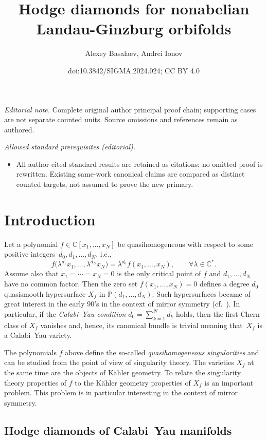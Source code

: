 \documentclass[10pt,a4paper]{article}
\title{Hodge diamonds for nonabelian Landau-Ginzburg orbifolds}
\author{Alexey Basalaev, Andrei Ionov}
\date{doi:10.3842/SIGMA.2024.024; CC BY 4.0}
\numberwithin{equation}{section}
\newcommand{\CC}{{\mathbb{C}}}
\newcommand{\PP}{{\mathbb{P}}}
\begin{document}
\maketitle
\noindent\textit{Editorial note.} Complete original author principal proof chain; supporting cases are not separate counted units. Source omissions and references remain as authored.\par\medskip
\noindent\textit{Allowed standard prerequisites (editorial).}\begin{itemize}
\item All author-cited standard results are retained as citations; no omitted proof is rewritten. Existing same-work canonical claims are compared as distinct counted targets, not assumed to prove the new primary.
\end{itemize}\medskip
\section{Introduction}

Let a polynomial $f \in \CC[x_1,\dots,x_N]$ be quasihomogeneous with respect to some positive integers~${d_0,d_1,\dots,d_N}$, i.e.,
\[
	f\bigl(\lambda^{d_1}x_1,\dots,\lambda^{d_N}x_N\bigr) = \lambda^{d_0} f(x_1,\dots,x_N), \qquad \forall \lambda \in \CC^\ast.
\]
Assume also that $x_1=\cdots=x_N = 0$ is the only critical point of $f$ and $d_1,\dots,d_N$ have no common factor. Then the zero set ${f(x_1,\dots,x_N)=0}$ defines a degree $d_0$ quasismooth hypersurface $X_f$ in $\PP(d_1,\dots,d_N)$. Such hypersurfaces became of great interest in the early 90's in the context of mirror symmetry (cf.~\cite{BH95,BH93}). In particular, if the \textit{Calabi--Yau condition} $d_0 = \sum_{k=1}^N d_k$ holds, then the first Chern class of $X_f$ vanishes and, hence, its canonical bundle is trivial meaning that~$X_f$ is a Calabi--Yau variety.

The polynomials $f$ above define the so-called \textit{quasihomogeneous singularities} and can be studied from the point of view of singularity theory. The varieties $X_f$ at the same time are the objects of K\"ahler geometry. To relate the singularity theory properties of $f$ to the K\"ahler geometry properties of $X_f$ is an important problem. This problem is in particular interesting in the context of mirror symmetry.

\subsection{Hodge diamonds of Calabi--Yau manifolds}
\end{document}
